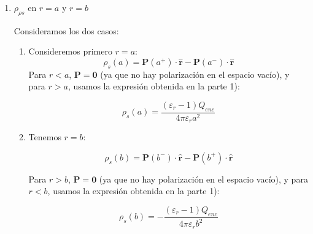 \begin{problema}
\begin{enumerate}
\begin{sol}
        \end{sol}
        \item $\rho_{\rho s}$ en $r=a$ y $r=b$
        \begin{sol}
            Consideramos los dos casos: 
            \begin{enumerate}
                \item Consideremos primero $r = a$:
                $$\rho_s(a) = \mathbf{P}(a^+) \cdot \hat{\mathbf{r}} - \mathbf{P}(a^-) \cdot \hat{\mathbf{r}}$$
                Para $r<a$, $\mathbf{P} = \mathbf{0}$ (ya que no hay polarización en el espacio vacío), y para $r>a$, usamos la expresión obtenida en la parte 1):

                $$\rho_s(a) = \frac{(\varepsilon_r - 1)Q_{enc}}{4\pi \varepsilon_r a^2}$$
                \item Tenemos $r = b$:

                $$\rho_s(b) = \mathbf{P}(b^-) \cdot \hat{\mathbf{r}} - \mathbf{P}(b^+) \cdot \hat{\mathbf{r}}$$
                
                Para $r>b$, $\mathbf{P} = \mathbf{0}$ (ya que no hay polarización en el espacio vacío), y para $r<b$, usamos la expresión obtenida en la parte 1):
                
                $$\rho_s(b) = -\frac{(\varepsilon_r - 1)Q_{enc}}{4\pi \varepsilon_r b^2}$$
            \end{enumerate}
            


        \end{sol}
    \end{enumerate}

\end{problema}

